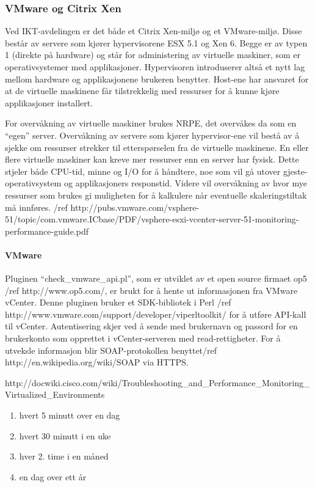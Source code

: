 \subsubsection{VMware og Citrix Xen}


Ved IKT-avdelingen er det både et Citrix Xen-miljø og et VMware-miljø. Disse består av servere som kjører hypervisorene ESX 5.1 og Xen 6. Begge er av typen 1 (direkte på hardware) og står for administering av virtuelle maskiner, som er operativsystemer med applikasjoner. Hypervisoren introduserer altså  et nytt lag mellom hardware og applikasjonene brukeren benytter. Host-ene har ansvaret for at de virtuelle maskinene får tilstrekkelig med ressurser for å kunne kjøre applikasjoner installert. 

For overvåkning av virtuelle maskiner brukes NRPE, det overvåkes da som en “egen” server. Overvåkning av servere som kjører hypervisor-ene vil bestå av å sjekke om ressurser strekker til etterspørselen fra de virtuelle maskinene. En eller flere virtuelle maskiner kan kreve mer ressurser enn en server har fysisk. Dette stjeler både CPU-tid, minne og I/O for å håndtere, noe som vil gå utover gjeste-operativsystem og applikasjoners responstid. Videre vil overvåkning av hvor mye ressurser som brukes gi muligheten for å kalkulere når eventuelle skaleringstiltak må innføres. /ref http://pubs.vmware.com/vsphere-51/topic/com.vmware.ICbase/PDF/vsphere-esxi-vcenter-server-51-monitoring-performance-guide.pdf

\paragraph{VMware}

Pluginen “check\_vmware\_api.pl”, som er utviklet av et open source firmaet op5 /ref http://www.op5.com/, er brukt for å hente ut informasjonen fra VMware vCenter. Denne pluginen bruker et SDK-bibliotek i Perl /ref http://www.vmware.com/support/developer/viperltoolkit/ for å utføre API-kall til vCenter. Autentisering skjer ved å sende med brukernavn og passord for en brukerkonto som opprettet i vCenter-serveren med read-rettigheter. For å utveksle informasjon blir SOAP-protokollen benyttet/ref http://en.wikipedia.org/wiki/SOAP via HTTPS. 

http://docwiki.cisco.com/wiki/Troubleshooting\_and\_Performance\_Monitoring\_Virtualized\_Environments

\begin{enumerate}
	\item hvert 5 minutt over en dag 
	\item hvert 30 minutt i en uke
	\item hver 2. time i en måned
	\item en dag over ett år
\end{enumerate}

